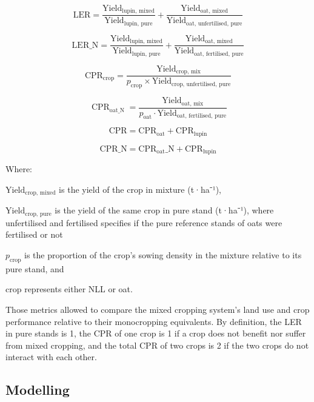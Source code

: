 \documentclass[
  british,
  a4paper,
  DIV=11,
  numbers=noendperiod]{scrreprt}
\begin{document}
\[
\text{LER} = 
\frac{\text{Yield}_{\text{lupin, mixed}}}{\text{Yield}_{\text{lupin, pure}}}
+
\frac{\text{Yield}_{\text{oat, mixed}}}{\text{Yield}_{\text{oat, unfertilised, pure}}}
\]

\[
\text{LER\_N} = 
\frac{\text{Yield}_{\text{lupin, mixed}}}{\text{Yield}_{\text{lupin, pure}}}
+
\frac{\text{Yield}_{\text{oat, mixed}}}{\text{Yield}_{\text{oat, fertilised, pure}}}
\]

\[
\text{CPR}_{\text{crop}} = \frac{\text{Yield}_{\text{crop, mix}}}{p_{\text{crop}} \times \text{Yield}_{\text{crop, unfertilised, pure}}}
\]

\[
\operatorname{CPR}_{\text{oat\_N}}
= \frac{\text{Yield}_{\text{oat, mix}}}{p_{\text{oat}} \cdot \text{Yield}_{\text{oat, fertilised, pure}}}
\]

\[
\text{CPR} = \text{CPR}_{\text{oat}} + \text{CPR}_{\text{lupin}}
\]

\[
\text{CPR\_N} = \text{CPR}_{\text{oat}}\text{\_N} + \text{CPR}_{\text{lupin}}
\]

Where:

\(\text{Yield}_{\text{crop, mixed}}\) is the yield of the crop in
mixture (t·ha⁻¹),

\(\text{Yield}_{\text{crop, pure}}\) is the yield of the same crop in
pure stand (t·ha⁻¹), where unfertilised and fertilised specifies if the
pure reference stands of oats were fertilised or not

\(p_{\text{crop}}\) is the proportion of the crop's sowing density in
the mixture relative to its pure stand, and

\(\text{crop}\) represents either NLL or oat.

Those metrics allowed to compare the mixed cropping system's land use
and crop performance relative to their monocropping equivalents. By
definition, the LER in pure stands is 1, the CPR of one crop is 1 if a
crop does not benefit nor suffer from mixed cropping, and the total CPR
of two crops is 2 if the two crops do not interact with each other.

\subsection{Modelling}\label{modelling}
\end{document}

